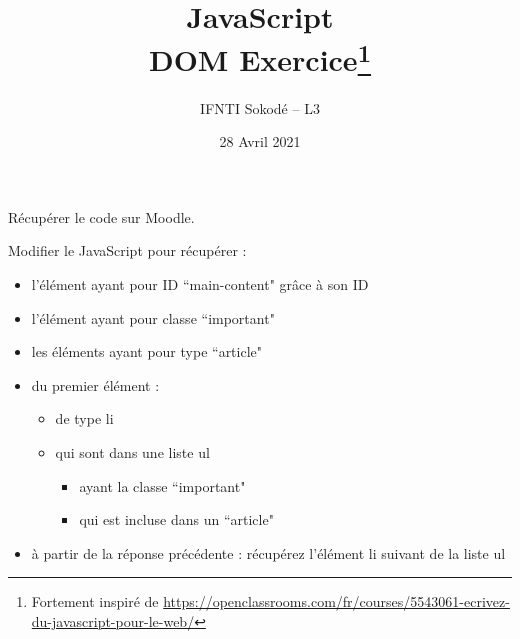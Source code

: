 \documentclass[10pt,a4paper]{article}
\title{JavaScript\\DOM Exercice\footnote{Fortement inspiré de \url{https://openclassrooms.com/fr/courses/5543061-ecrivez-du-javascript-pour-le-web/}}}
\author{IFNTI Sokodé -- L3}
\date{28 Avril 2021}
\begin{document}
Récupérer le code sur Moodle.

Modifier le JavaScript pour récupérer :
\begin{itemize}
	\item l'élément ayant pour ID ``main-content" grâce à son ID
	\item l'élément ayant pour classe ``important" 
	\item les éléments ayant pour type ``article"
	\item du premier élément :
	\begin{itemize}
		\item de type li
		\item qui sont dans une liste ul 
		\begin{itemize}
			\item ayant la classe ``important"
			\item qui est incluse dans un ``article"
		\end{itemize}				
	\end{itemize}
	\item à partir de la réponse précédente : récupérez l'élément li suivant de la liste ul
\end{itemize}
\end{document}
